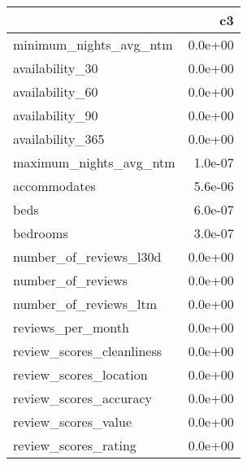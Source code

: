 
\begin{tabular}[t]{lr}
\toprule
  & c3\\
\midrule
minimum\_nights\_avg\_ntm & 0.0e+00\\
availability\_30 & 0.0e+00\\
availability\_60 & 0.0e+00\\
availability\_90 & 0.0e+00\\
availability\_365 & 0.0e+00\\
\addlinespace
maximum\_nights\_avg\_ntm & 1.0e-07\\
accommodates & 5.6e-06\\
beds & 6.0e-07\\
bedrooms & 3.0e-07\\
number\_of\_reviews\_l30d & 0.0e+00\\
\addlinespace
number\_of\_reviews & 0.0e+00\\
number\_of\_reviews\_ltm & 0.0e+00\\
reviews\_per\_month & 0.0e+00\\
review\_scores\_cleanliness & 0.0e+00\\
review\_scores\_location & 0.0e+00\\
\addlinespace
review\_scores\_accuracy & 0.0e+00\\
review\_scores\_value & 0.0e+00\\
review\_scores\_rating & 0.0e+00\\
\bottomrule
\end{tabular}